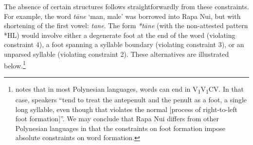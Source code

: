 
The absence of certain structures follows straightforwardly from these constraints. For example, the  word \textit{tāne} ‘man, male’ was borrowed into Rapa Nui, but with shortening of the first vowel: \textit{tane}. The form \textit{*tāne} (with the non-attested pattern *HL) would involve either a degenerate foot at the end of the word (violating constraint 4), a foot spanning a syllable boundary (violating constraint 3), or an unparsed syllable (violating constraint 2). These alternatives are illustrated below.\footnote{\label{fn:48}\citet[171]{Finney1999} notes that in most Polynesian languages, words can end in V\textsubscript{1}V\textsubscript{1}CV. In that case, speakers “tend to treat the antepenult and the penult as a foot, a single long syllable, even though that violates the normal [process of right-to-left foot formation]”. We may conclude that Rapa Nui differs from other Polynesian languages in that the constraints on foot formation impose absolute constraints on word formation.} 

